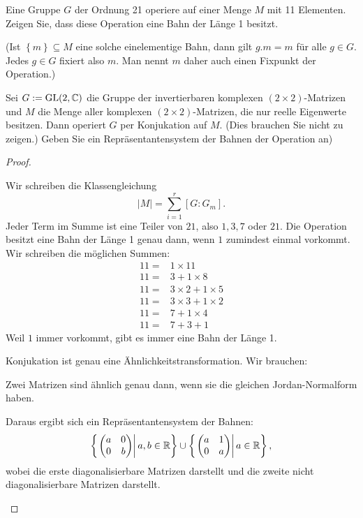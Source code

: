 \begin{Problem}
	\begin{parts}
		\item Eine Gruppe $G$ der Ordnung 21 operiere auf einer Menge $M$ mit 11 Elementen. Zeigen Sie, dass diese Operation eine Bahn der Länge 1 besitzt.

			{\footnotesize (Ist $\left\{ m \right\} \subseteq M$ eine solche einelementige Bahn, dann gilt $g.m=m$ f\"{u}r alle $g\in G$. Jedes $g\in G$ fixiert also $m$. Man nennt $m$ daher auch einen Fixpunkt der Operation.)} 
		\item Sei $G:=\text{GL}(2,\mathbb{C})$ die Gruppe der invertierbaren komplexen $(2\times 2)$-Matrizen und $M$ die Menge aller komplexen $(2\times 2)$-Matrizen, die nur reelle Eigenwerte besitzen. Dann operiert $G$ per Konjukation auf $M$. (Dies brauchen Sie nicht zu zeigen.) Geben Sie ein Repräsentantensystem der Bahnen der Operation an)
		\end{parts}
\end{Problem}
\begin{proof}
	\begin{parts}
	\item Wir schreiben die Klassengleichung
		\[
			|M|=\sum_{i=1}^r [G:G_m]
		.\] 
		Jeder Term im Summe ist eine Teiler von $21$, also $1,3,7$ oder $21$. Die Operation besitzt eine Bahn der Länge 1 genau dann, wenn $1$ zumindest einmal vorkommt. Wir schreiben die möglichen Summen:
	\begin{align*}
		11=&1\times 11\\
		11=&3+1\times 8\\
		11=&3\times 2+1\times 5\\
		11=&3\times 3+1\times 2\\
		11=&7+1\times 4\\
		11=&7+3+1
	\end{align*} 
	Weil $1$ immer vorkommt, gibt es immer eine Bahn der Länge 1.
	\item Konjukation ist genau eine Ähnlichkeitstransformation. Wir brauchen: 
		\begin{tcolorbox}
			Zwei Matrizen sind ähnlich genau dann, wenn sie die gleichen Jordan-Normalform haben.
		\end{tcolorbox}
Daraus ergibt sich ein Repräsentantensystem der Bahnen:
		\[
			\left\{ \left.\begin{pmatrix} a & 0 \\ 0 & b \end{pmatrix} \right|a,b\in \mathbb{R} \right\} \cup \left\{ \left.\begin{pmatrix} a & 1 \\ 0 & a \end{pmatrix} \right|a\in \mathbb{R} \right\} 
		,\] 
		wobei die erste diagonalisierbare Matrizen darstellt und die zweite nicht diagonalisierbare Matrizen darstellt.\qedhere
	\end{parts}
\end{proof}

